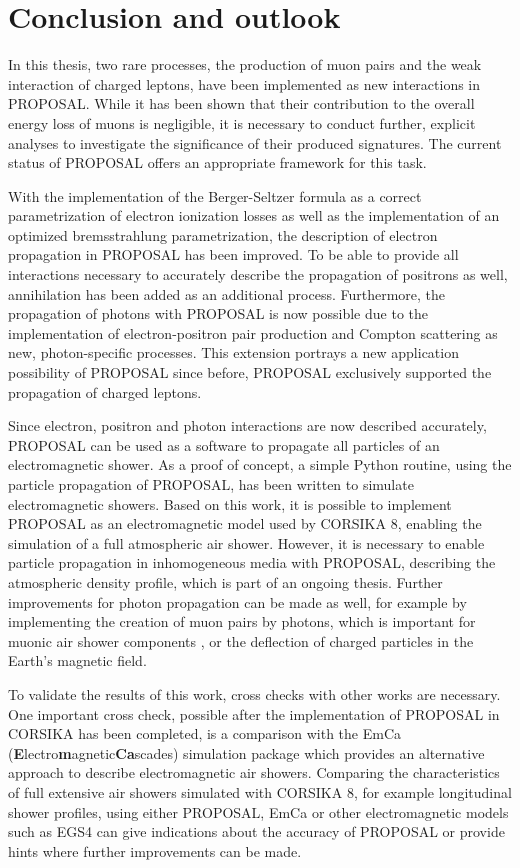 \chapter{Conclusion and outlook} 

In this thesis, two rare processes, the production of muon pairs and the weak interaction of charged leptons, have been implemented as new interactions in PROPOSAL.
While it has been shown that their contribution to the overall energy loss of muons is negligible, it is necessary to conduct further, explicit analyses to investigate the significance of their produced signatures.
The current status of PROPOSAL offers an appropriate framework for this task.

With the implementation of the Berger-Seltzer formula as a correct parametrization of electron ionization losses as well as the implementation of an optimized bremsstrahlung parametrization, the description of electron propagation in PROPOSAL has been improved.
To be able to provide all interactions necessary to accurately describe the propagation of positrons as well, annihilation has been added as an additional process.
Furthermore, the propagation of photons with PROPOSAL is now possible due to the implementation of electron-positron pair production and Compton scattering as new, photon-specific processes.
This extension portrays a new application possibility of PROPOSAL since before, PROPOSAL exclusively supported the propagation of charged leptons.

Since electron, positron and photon interactions are now described accurately, PROPOSAL can be used as a software to propagate all particles of an electromagnetic shower.
As a proof of concept, a simple Python routine, using the particle propagation of PROPOSAL, has been written to simulate electromagnetic showers.
Based on this work, it is possible to implement PROPOSAL as an electromagnetic model used by CORSIKA 8, enabling the simulation of a full atmospheric air shower.
However, it is necessary to enable particle propagation in inhomogeneous media with PROPOSAL, describing the atmospheric density profile, which is part of an ongoing thesis.
Further improvements for photon propagation can be made as well, for example by implementing the creation of muon pairs by photons, which is important for muonic air shower components \cite{corsika_physics}, or the deflection of charged particles in the Earth's magnetic field.

To validate the results of this work, cross checks with other works are necessary.
One important cross check, possible after the implementation of PROPOSAL in CORSIKA has been completed, is a comparison with the EmCa (\textbf{E}lectro\textbf{m}agnetic\-\textbf{Ca}scades) simulation package \cite{meighenberger2019emca} which provides an alternative approach to describe electromagnetic air showers.
Comparing the characteristics of full extensive air showers simulated with CORSIKA 8, for example longitudinal shower profiles, using either PROPOSAL, EmCa or other electromagnetic models such as EGS4 can give indications about the accuracy of PROPOSAL or provide hints where further improvements can be made.